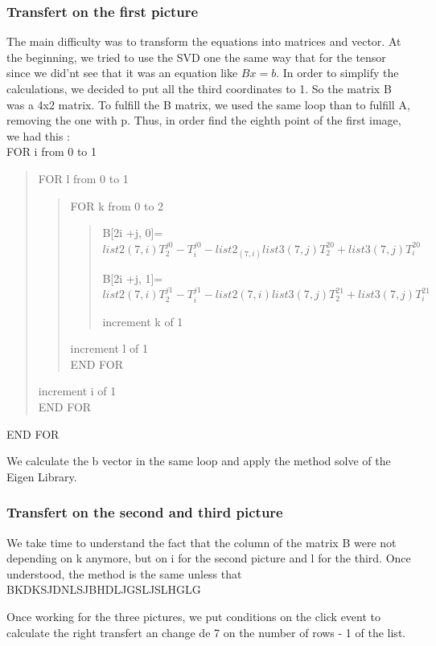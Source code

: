 \documentclass{report}
\begin{document}
\subsubsection{Transfert on the first picture}
The main difficulty was to transform the equations into matrices and vector. At the beginning, we tried to use the SVD one the same way that for the tensor since we did'nt see that it was an equation like $Bx = b$.
In order to simplify the calculations, we decided to put all the third coordinates to 1. So the matrix B was a 4x2 matrix. To fulfill the B matrix, we used the same loop than to fulfill A, removing the one with p. 
Thus, in order find the eighth point of the first image, we had this :
\\FOR i from 0 to 1
		\begin{verse}
		FOR l from 0 to 1
			\begin{verse}
			FOR k from 0 to 2
\begin{verse}
\begin{list}{•}{•}
\item 
B[2i +j, 0]= $list2(7,i)T_{2}^{j0} - T_{i}^{j0} - list2_(7,i)list3(7,j)T_{2}^{20} + list3(7,j)T_{i}^{20}$
\item 
B[2i +j, 1]= $list2(7,i)T_{2}^{j1} - T_{i}^{j1} - list2(7,i)list3(7,j)T_{2}^{21} + list3(7,j)T_{i}^{21}$
\end{list}


increment k of 1
\end{verse}
				increment l of 1
			\\END FOR
			\end{verse}
			increment i of 1		
		\\END FOR
		\end{verse}	
	END FOR

We calculate the b vector in the same loop and apply the method solve of the Eigen Library. 

\subsubsection{Transfert on the second and third picture}
We take time to understand the fact that the column of the matrix B were not depending on k anymore, but on i for the second picture and l for the third. Once understood, the method is the same unless that 
BKDKSJDNLSJBHDLJGSLJSLHGLG


Once working for the three pictures, we put conditions on the click event to calculate the right transfert an change de 7 on the number of rows - 1 of the list. 
\end{document}
